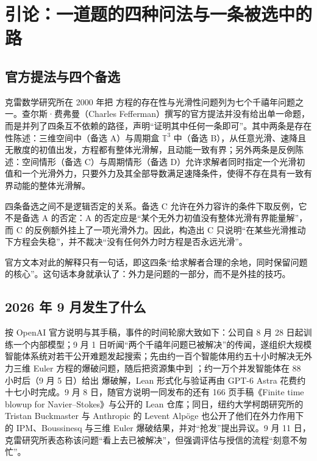 
\section{引论：一道题的四种问法与一条被选中的路}

\subsection{官方提法与四个备选}

克雷数学研究所在 2000 年把 \NS{} 方程的存在性与光滑性问题列为七个千禧年问题之一。查尔斯·费弗曼（Charles Fefferman）撰写的官方提法\cite{clay}并没有给出单一命题，而是并列了四条互不依赖的路径，声明“证明其中任何一条即可”。其中两条是存在性陈述：三维空间中（备选 A）与周期盒 $\mathbb{T}^{3}$ 中（备选 B），从任意光滑、速降且无散度的初值出发，方程都有整体光滑解，且动能一致有界；另外两条是反例陈述：空间情形（备选 C）与周期情形（备选 D）允许求解者同时指定一个光滑初值和一个光滑外力，只要外力及其全部导数满足速降条件，使得不存在具有一致有界动能的整体光滑解。

\begin{keybox}
四条备选之间不是逻辑否定的关系。备选 C 允许在外力容许的条件下取反例，它不是备选 A 的否定：A 的否定应是“某个无外力初值没有整体光滑有界能量解”，而 C 的反例额外挂上了一项光滑外力。因此，构造出 C 只说明“在某些光滑推动下方程会失稳”，并不裁决“没有任何外力时方程是否永远光滑”。
\end{keybox}

官方文本对此的解释只有一句话，即这四条“给求解者合理的余地，同时保留问题的核心”。这句话本身就承认了：外力是问题的一部分，而不是外挂的技巧。

\subsection{2026 年 9 月发生了什么}

按 OpenAI 官方说明\cite{openai-blog}与其手稿\cite{openai-paper}，事件的时间轮廓大致如下：公司自 8 月 28 日起训练一个内部模型；9 月 1 日听闻“两个千禧年问题已被解决”的传闻，遂组织大规模智能体系统对若干公开难题发起搜索；先由约一百个智能体用约五十小时解决无外力三维 Euler 方程的爆破问题，随后把资源集中到 \NS{}；约一万个并发智能体在 88 小时后（9 月 5 日）给出 \NS{} 爆破解，Lean 形式化与验证再由 GPT-6 Astra 花费约十七小时完成。9 月 8 日，随官方说明一同发布的还有 166 页手稿《Finite time blowup for Navier--Stokes》与公开的 Lean 仓库\cite{openai-lean}；同日，纽约大学柯朗研究所的 Tristan Buckmaster 与 Anthropic 的 Levent Alpöge 也公开了他们在外力作用下的 IPM、Boussinesq 与三维 Euler 爆破结果，并对“抢发”提出异议。9 月 11 日，克雷研究所表态称该问题“看上去已被解决”，但强调评估与授信的流程“刻意不匆忙”\cite{clay-news}。

